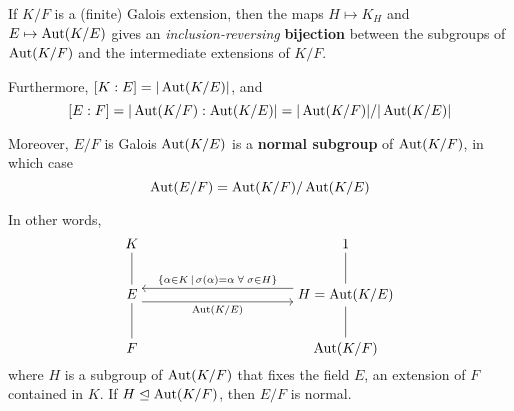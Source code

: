 \documentclass[12pt]{article}
\begin{document}
\begin{theorem}
     If $K/F$ is a (finite) Galois extension, then the maps $H\mapsto K_H$ and $E\mapsto \operatorname{Aut}(K/E)$ gives an \textit{inclusion-reversing} \textbf{bijection} between the subgroups of $\operatorname{Aut}(K/F)$ and the intermediate extensions of $K/F$. 
    
    Furthermore, $[K:E]=|\operatorname{Aut}(K/E)|$, and $$[E:F] = |\operatorname{Aut}(K/F):\operatorname{Aut}(K/E)| = |\operatorname{Aut}(K/F)|/|\operatorname{Aut}(K/E)|$$

    Moreover, $E/F$ is Galois \ifnif $\operatorname{Aut}(K/E)$ is a \textbf{normal subgroup} of $\operatorname{Aut}(K/F)$, in which case $$\operatorname{Aut}(E/F)=\operatorname{Aut}(K/F)/\operatorname{Aut}(K/E)$$

    In other words,
    \[\begin{tikzcd}[ampersand replacement=\&,cramped,column sep=large,row sep=2.25em]
        K \&\&\& 1 \\
        E \&\&\& {H=\Aut(K/E)} \\
        F \&\&\& {\mathrm{Aut}(K/F)}
        \arrow["{\{\alpha\in K\, \mid\, \sigma(\alpha)=\alpha\; \forall\; \sigma\in H\}}"', shift right=2, from=2-4, to=2-1]
        \arrow["{\mathrm{Aut}(K/E)}"', shift right=2, from=2-1, to=2-4]
        \arrow[no head, from=1-1, to=2-1]
        \arrow[no head, from=2-1, to=3-1]
        \arrow[no head, from=1-4, to=2-4]
        \arrow[no head, from=2-4, to=3-4]
    \end{tikzcd}\]
    where $H$ is a subgroup of $\operatorname{Aut}(K/F)$ that fixes the field $E$, an extension of $F$ contained in $K$. If $H\trianglelefteq \operatorname{Aut}(K/F)$, then $E/F$ is normal.
\end{theorem}
\end{document}
